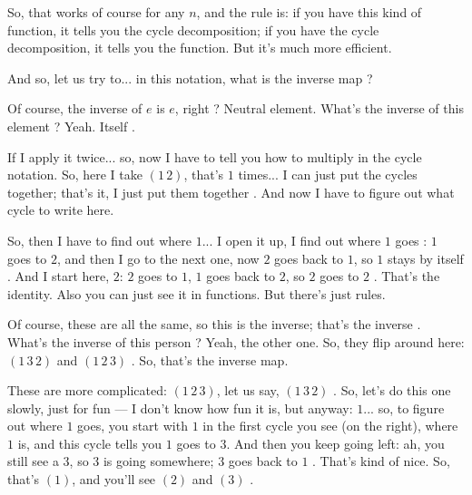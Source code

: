 \begin{speech}[01:10:55 - 01:12:53]
So, that works of course for any $n$, and the rule is: if you have this kind of function, it tells you the cycle decomposition; if you have the cycle decomposition, it tells you the function. But it's much more efficient.

And so, let us try to... in this notation, what is the inverse map ?

Of course, the inverse of $e$ is $e$, right ? Neutral element. What's the inverse of this element ?  Yeah. Itself .

If I apply it twice... so, now I have to tell you how to multiply in the cycle notation. So, here I take $(1\,2)$, that's $1$ times... I can just put the cycles together; that's it, I just put them together . And now I have to figure out what cycle to write here.

So, then I have to find out where $1$... I open it up, I find out where $1$ goes : $1$ goes to $2$, and then I go to the next one, now $2$ goes back to $1$, so $1$ stays by itself . And I start here, $2$: $2$ goes to $1$, $1$ goes back to $2$, so $2$ goes to $2$ . That's the identity. Also you can just see it in functions. But there's just rules.

Of course, these are all the same, so this is the inverse; that's the inverse . What's the inverse of this person ?  Yeah, the other one. So, they flip around here: $(1\,3\,2)$ and $(1\,2\,3)$ . So, that's the inverse map.

These are more complicated: $(1\,2\,3)$, let us say, $(1\,3\,2)$ . So, let's do this one slowly, just for fun --- I don't know how fun it is, but anyway: $1$... so, to figure out where $1$ goes, you start with $1$ in the first cycle you see (on the right), where $1$ is, and this cycle tells you $1$ goes to $3$. And then you keep going left: ah, you still see a $3$, so $3$ is going somewhere; $3$ goes back to $1$ . That's kind of nice. So, that's $(1)$, and you'll see $(2)$ and $(3)$ .
\end{speech}


